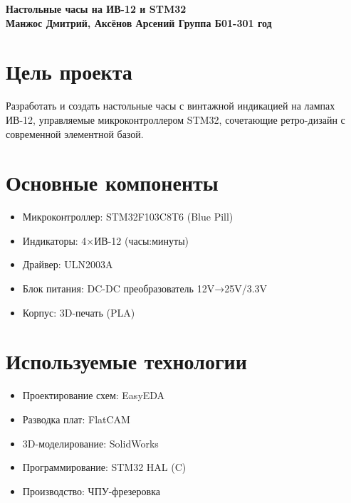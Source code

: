 \documentclass[a3paper,landscape]{article}
\begin{document}
\pagestyle{empty}

\begin{center}
{\fontsize{36}{40}\selectfont\bfseries\color{primary} Настольные часы на ИВ-12 и STM32} \\
\vspace{0.8cm}
{\Large\bfseries Манжос Дмитрий, Аксёнов Арсений \quad Группа Б01-301  год}
\end{center}

\vspace{1cm}

\begin{multicols}{2}

\section*{Цель проекта}
Разработать и создать настольные часы с винтажной индикацией на лампах ИВ-12, управляемые микроконтроллером STM32, сочетающие ретро-дизайн с современной элементной базой.

\section*{Основные компоненты}
\begin{itemize}[leftmargin=*,itemsep=0.5ex,topsep=0.5ex]
    \item Микроконтроллер: STM32F103C8T6 (Blue Pill)
    \item Индикаторы: 4×ИВ-12 (часы:минуты)
    \item Драйвер: ULN2003A
    \item Блок питания: DC-DC преобразователь 12V→25V/3.3V
    \item Корпус: 3D-печать (PLA)
\end{itemize}

\section*{Используемые технологии}
\begin{itemize}[leftmargin=*,itemsep=0.5ex,topsep=0.5ex]
    \item Проектирование схем: EasyEDA
    \item Разводка плат: FlatCAM
    \item 3D-моделирование: SolidWorks
    \item Программирование: STM32 HAL (C)
    \item Производство: ЧПУ-фрезеровка
\end{itemize}


\end{multicols}
\end{document}
